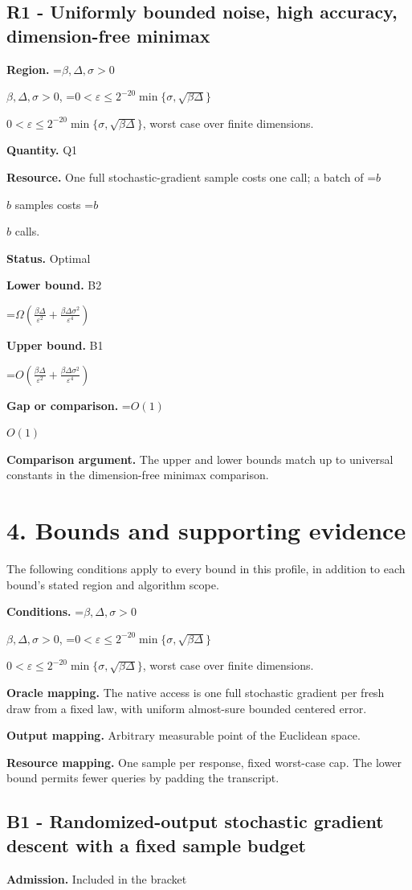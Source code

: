 \documentclass[10pt,a4paper]{article}
\newcommand{\AtlasMath}[1]{\par\begingroup\centering\setbox0=\hbox{$\displaystyle #1$}\ifdim\wd0>1.4\linewidth\typeout{ATLAS WIDE FORMULA: \the\wd0}\fi\ifdim\wd0>\linewidth\resizebox{\linewidth}{!}{\box0}\else\box0\fi\par\endgroup}
\newcommand{\AtlasInlineMath}[1]{\begingroup\setbox0=\hbox{$#1$}\ifdim\wd0>.4\linewidth\endgroup\AtlasMath{#1}\else\endgroup$#1$\fi}
\begin{document}
\subsection{R1 - Uniformly bounded noise, high accuracy, dimension-free minimax}
\textbf{Region.} \AtlasInlineMath{\beta,\Delta,\sigma>0}, \AtlasInlineMath{0<\varepsilon\le 2^{-20}\min\{\sigma,\sqrt{\beta\Delta}\}}, worst case over finite dimensions.

\textbf{Quantity.} Q1

\textbf{Resource.} One full stochastic-gradient sample costs one call; a batch of \AtlasInlineMath{b} samples costs \AtlasInlineMath{b} calls.

\textbf{Status.} Optimal

\textbf{Lower bound.} B2

\AtlasMath{\Omega\!\left(\frac{\beta\Delta}{\varepsilon^2}+\frac{\beta\Delta\sigma^2}{\varepsilon^4}\right)}
\textbf{Upper bound.} B1

\AtlasMath{O\!\left(\frac{\beta\Delta}{\varepsilon^2}+\frac{\beta\Delta\sigma^2}{\varepsilon^4}\right)}
\textbf{Gap or comparison.} \AtlasInlineMath{O(1)}

\textbf{Comparison argument.} The upper and lower bounds match up to universal constants in the dimension-free minimax comparison.

\section{4. Bounds and supporting evidence}
The following conditions apply to every bound in this profile, in addition to each bound's stated region and algorithm scope.

\textbf{Conditions.} \AtlasInlineMath{\beta,\Delta,\sigma>0}, \AtlasInlineMath{0<\varepsilon\le 2^{-20}\min\{\sigma,\sqrt{\beta\Delta}\}}, worst case over finite dimensions.

\textbf{Oracle mapping.} The native access is one full stochastic gradient per fresh draw from a fixed law, with uniform almost-sure bounded centered error.

\textbf{Output mapping.} Arbitrary measurable point of the Euclidean space.

\textbf{Resource mapping.} One sample per response, fixed worst-case cap. The lower bound permits fewer queries by padding the transcript.

\subsection{B1 - Randomized-output stochastic gradient descent with a fixed sample budget}
\textbf{Admission.} Included in the bracket
\end{document}
